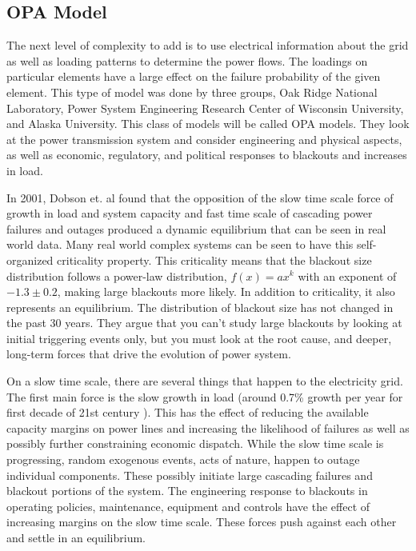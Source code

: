 \subsection{OPA Model}\label{opa_section}

The next level of complexity to add is to use electrical information about the grid as well as loading patterns to determine the power flows.  The loadings on particular elements have a large effect on the failure probability of the given element.  This type of model was done by three groups, Oak Ridge National Laboratory, Power System Engineering Research Center of Wisconsin University, and Alaska University.  This class of models will be called OPA models.  They look at the power transmission system and consider engineering and physical aspects, as well as economic, regulatory, and political responses to blackouts and increases in load.

In 2001, Dobson et. al \cite{dobson_2001} found that the opposition of the slow time scale force of growth in load and system capacity and fast time scale of cascading power failures and outages produced a dynamic equilibrium that can be seen in real world data.  Many real world complex systems can be seen to have this self-organized criticality property.  This criticality means that the blackout size distribution follows a power-law distribution, $f(x) = ax^k$ with an exponent of $-1.3 \pm 0.2$,  making large blackouts more likely.  In addition to criticality, it also represents an equilibrium.  The distribution of blackout size has not changed in the past 30 years.  They argue that you can't study large blackouts by looking at initial triggering events only, but you must look at the root cause, and deeper, long-term forces that drive the evolution of power system.

On a slow time scale, there are several things that happen to the electricity grid.  The first main force is the slow growth in load (around 0.7\% growth per year for first decade of 21st century \cite{eia_gov}).  This has the effect of reducing the available capacity margins on power lines and increasing the likelihood of failures as well as possibly further constraining economic dispatch.  While the slow time scale is progressing, random exogenous events, acts of nature, happen to outage individual components.  These possibly initiate large cascading failures and blackout portions of the system.  The engineering response to blackouts in operating policies, maintenance, equipment and controls have the effect of increasing margins on the slow time scale.  These forces push against each other and settle in an equilibrium.

